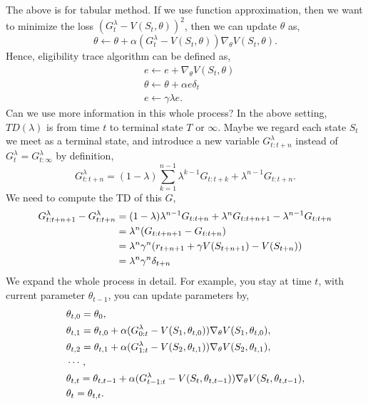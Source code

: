 \documentclass[11pt,a4paper]{article}
\begin{document}
The above is for tabular method. If we use function approximation, then we want to minimize the loss $(G_t^{\lambda} - V(S_t,\theta))^2$, then we can update $\theta$ as,
\begin{equation}
    \theta \leftarrow \theta + \alpha (G_t^\lambda - V(S_t, \theta)) \nabla_\theta V(S_t,\theta).
\end{equation}
Hence, eligibility trace algorithm can be defined as,
\begin{eqnarray}
    & e \leftarrow e + \nabla_\theta V(S_t, \theta) \\ 
    & \theta \leftarrow \theta + \alpha e \delta_t \\ 
    & e \leftarrow \gamma\lambda e.
\end{eqnarray}
Can we use more information in this whole process? In the above setting, $TD(\lambda)$ is from time $t$ to terminal state $T$ or $\infty$. Maybe we regard each state $S_t$ we meet as a terminal state, and introduce a new variable $G_{t:t+n}^{\lambda}$ instead of $G_t^{\lambda} = G_{t:\infty}^{\lambda}$ by definition\cite{seijen2014true},
\begin{equation}
    G_{t:t+n}^{\lambda} = (1-\lambda)\sum_{k=1}^{n-1}\lambda^{k-1}G_{t:t+k} + \lambda^{n-1}G_{t:t+n}.
\end{equation}
We need to compute the TD of this $G$,
\begin{equation}
    \aligned 
    G_{t:t+n+1}^{\lambda} - G_{t:t+n}^{\lambda} & = (1-\lambda) \lambda^{n-1} G_{t:t+n} + \lambda^n G_{t:t+n+1} - \lambda^{n-1} G_{t:t+n} \\ 
    & = \lambda^n(G_{t:t+n+1}-G_{t:t+n}) \\ 
    & = \lambda^n \gamma^n (r_{t+n+1} + \gamma V(S_{t+n+1}) - V(S_{t+n})) \\ 
    & = \lambda^n \gamma^n \delta_{t+n}
    \endaligned 
\end{equation}
We expand the whole process in detail. For example, you stay at time $t$, with current parameter $\theta_{t-1}$, you can update parameters by,
\begin{equation}
\aligned 
& \theta_{t,0} = \theta_0, \\ 
& \theta_{t,1} = \theta_{t,0} + \alpha (G_{0:t}^{\lambda} - V(S_1, \theta_{t, 0})) \nabla_{\theta}V(S_1, \theta_{t, 0}), \\ 
& \theta_{t,2} = \theta_{t,1} + \alpha(G_{1:t}^{\lambda} - V(S_2, \theta_{t, 1})) \nabla_{\theta}V(S_2, \theta_{t,1}), \\ 
& \cdots , \\ 
& \theta_{t,t} = \theta_{t,t-1} + \alpha(G_{t-1:t}^{\lambda} - V(S_t, \theta_{t,t-1})) \nabla_{\theta}V(S_t, \theta_{t,t-1}), \\ 
& \theta_t = \theta_{t,t}.
\endaligned 
\end{equation}
\end{document}

